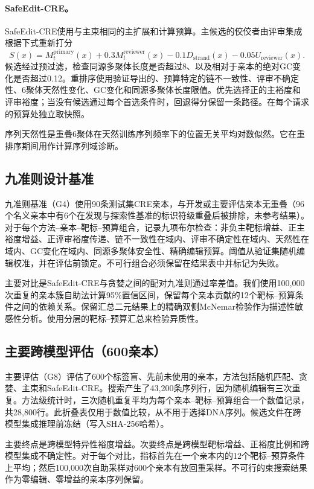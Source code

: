 \paragraph{SafeEdit-CRE。}
SafeEdit-CRE使用与主束相同的主扩展和计算预算。主候选的佼佼者由评审集成根据下式重新打分
\begin{equation}
S(x)=M_t^{\mathrm{primary}}(x)+0.3M_t^{\mathrm{reviewer}}(x)
-0.1D_{\mathrm{strand}}(x)-0.05U_{\mathrm{reviewer}}(x).
\end{equation}
候选经过预过滤，检查同源多聚体长度是否超过8、以及相对于亲本的绝对GC变化是否超过0.12。重排序使用验证导出的、预算特定的链不一致性、评审不确定性、6聚体天然性变化、GC变化和同源多聚体长度限值。优先选择正的主裕度和评审裕度；当没有候选通过每个首选条件时，回退得分保留一条路径。在每个请求的预算处独立取快照。

序列天然性是重叠6聚体在天然训练序列频率下的位置无关平均对数似然。它在重排序期间用作计算序列域诊断。

\subsection{九准则设计基准}

九准则基准（G4）使用90条测试集CRE亲本，与开发或主要评估亲本无重叠（96个名义亲本中有6个在发现与探索性基准的标识符级重叠后被排除，未参考结果）。对于每个方法--亲本--靶标--预算组合，记录九项布尔检查：非负主靶标增益、正主裕度增益、正评审裕度传递、链不一致性在域内、评审不确定性在域内、天然性在域内、GC变化在域内、同源多聚体安全性、精确编辑预算。阈值从验证集随机编辑校准，并在评估前锁定。不可行组合必须保留在结果表中并标记为失败。

主要对比是SafeEdit-CRE与贪婪之间的配对九准则通过率差值。我们使用100,000次重复的亲本簇自助法计算95\%置信区间，保留每个亲本贡献的12个靶标--预算条件之间的依赖关系。保留汇总二元结果上的精确双侧McNemar检验作为描述性敏感性分析。使用分层的靶标--预算汇总来检验异质性。

\subsection{主要跨模型评估（600亲本）}

主要评估（G8）评估了600个标签盲、先前未使用的亲本，方法包括随机匹配、贪婪、主束和SafeEdit-CRE。搜索产生了43,200条序列行，因为随机编辑有三次重复。方法级统计时，三次随机重复平均为每个亲本--靶标--预算组合一个数值记录，共28,800行。此折叠表仅用于数值比较，从不用于选择DNA序列。候选文件在跨模型集成推理前冻结（写入SHA-256哈希）。

主要终点是跨模型特异性裕度增益。次要终点是跨模型靶标增益、正裕度比例和跨模型集成不确定性。对于每个对比，指标首先在一个亲本内的12个靶标--预算条件上平均；然后100,000次自助采样对600个亲本有放回重采样。不可行的束搜索结果作为零编辑、零增益的亲本序列保留。

